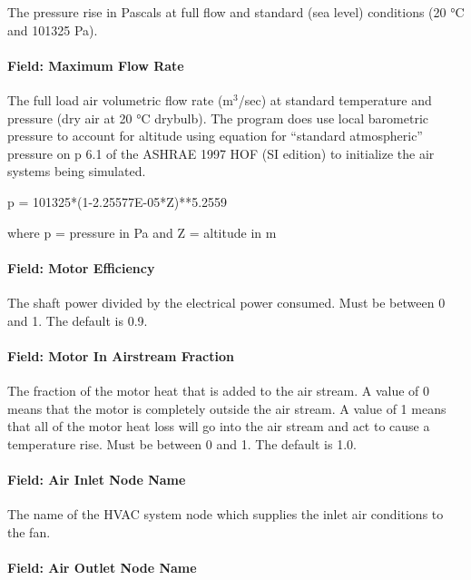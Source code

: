 The pressure rise in Pascals at full flow and standard (sea level) conditions (20 °C and 101325 Pa).

\paragraph{Field: Maximum Flow Rate}\label{field-maximum-flow-rate-000}

The full load air volumetric flow rate (m\(^{3}\)/sec) at standard temperature and pressure (dry air at 20 °C drybulb). The program does use local barometric pressure to account for altitude using equation for ``standard atmospheric'' pressure on p 6.1 of the ASHRAE 1997 HOF (SI edition) to initialize the air systems being simulated.

p = 101325*(1-2.25577E-05*Z)**5.2559

where p = pressure in Pa and Z = altitude in m

\paragraph{Field: Motor Efficiency}\label{field-motor-efficiency}

The shaft power divided by the electrical power consumed. Must be between 0 and 1. The default is 0.9.

\paragraph{Field: Motor In Airstream Fraction}\label{field-motor-in-airstream-fraction}

The fraction of the motor heat that is added to the air stream. A value of 0 means that the motor is completely outside the air stream. A value of 1 means that all of the motor heat loss will go into the air stream and act to cause a temperature rise. Must be between 0 and 1. The default is 1.0.

\paragraph{Field: Air Inlet Node Name}\label{field-air-inlet-node-name-002}

The name of the HVAC system node which supplies the inlet air conditions to the fan.

\paragraph{Field: Air Outlet Node Name}\label{field-air-outlet-node-name-002}


